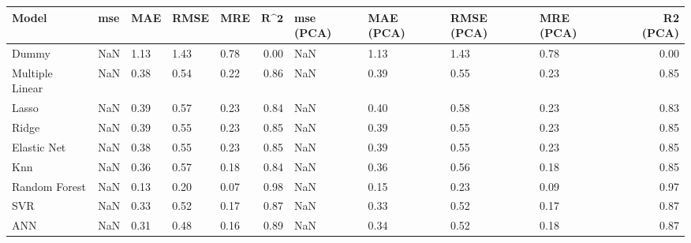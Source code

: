 \begin{table}
\centering
\label{table:iri_reg_pred}
\begin{tabular}{lllllrllllr}
\toprule
 \textbf{Model} & \textbf{mse} & \textbf{MAE} & \textbf{RMSE} & \textbf{MRE} & $\textbf{R^2}$ & \textbf{mse (PCA)} & \textbf{MAE (PCA)} & \textbf{RMSE (PCA)} & \textbf{MRE (PCA)} & \textbf{R2 (PCA)} \\
\midrule
          Dummy &          NaN &         1.13 &          1.43 &         0.78 &           0.00 &                NaN &               1.13 &                1.43 &               0.78 &              0.00 \\
Multiple Linear &          NaN &         0.38 &          0.54 &         0.22 &           0.86 &                NaN &               0.39 &                0.55 &               0.23 &              0.85 \\
          Lasso &          NaN &         0.39 &          0.57 &         0.23 &           0.84 &                NaN &               0.40 &                0.58 &               0.23 &              0.83 \\
          Ridge &          NaN &         0.39 &          0.55 &         0.23 &           0.85 &                NaN &               0.39 &                0.55 &               0.23 &              0.85 \\
    Elastic Net &          NaN &         0.38 &          0.55 &         0.23 &           0.85 &                NaN &               0.39 &                0.55 &               0.23 &              0.85 \\
            Knn &          NaN &         0.36 &          0.57 &         0.18 &           0.84 &                NaN &               0.36 &                0.56 &               0.18 &              0.85 \\
  Random Forest &          NaN &         0.13 &          0.20 &         0.07 &           0.98 &                NaN &               0.15 &                0.23 &               0.09 &              0.97 \\
            SVR &          NaN &         0.33 &          0.52 &         0.17 &           0.87 &                NaN &               0.33 &                0.52 &               0.17 &              0.87 \\
            ANN &          NaN &         0.31 &          0.48 &         0.16 &           0.89 &                NaN &               0.34 &                0.52 &               0.18 &              0.87 \\
\bottomrule
\end{tabular}
\end{table}
